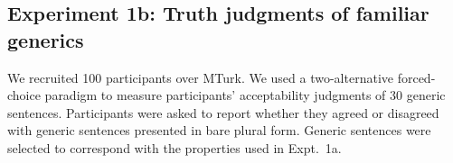 \documentclass{pnastwo}
\begin{document}
\begin{article}
\begin{materials}
\subsection{Experiment 1b: Truth judgments of familiar generics}
We recruited 100 participants over MTurk.  
We used a two-alternative forced-choice paradigm to measure participants' acceptability judgments of 30 generic sentences. 
Participants were asked to report whether they agreed or disagreed with generic sentences presented in bare plural form. 
Generic sentences were selected to correspond with the properties used in Expt.~1a. 


\end{materials}
\end{article}
\end{document}
